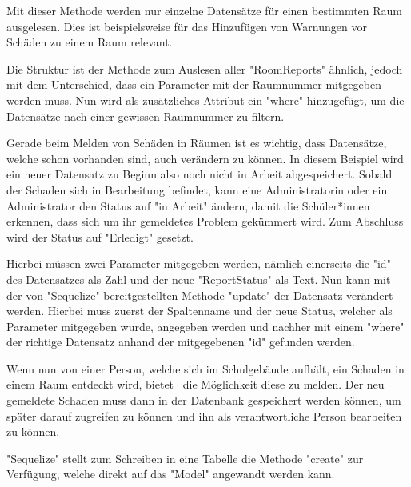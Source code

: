 

Mit dieser Methode werden nur einzelne Datensätze für einen bestimmten Raum ausgelesen. Dies ist beispielsweise für das Hinzufügen von Warnungen vor Schäden zu einem Raum relevant. 

Die Struktur ist der Methode zum Auslesen aller "RoomReports" ähnlich, jedoch mit dem Unterschied, dass ein Parameter mit der Raumnummer mitgegeben werden muss. Nun wird als zusätzliches Attribut ein "where" hinzugefügt, um die Datensätze nach einer gewissen Raumnummer zu filtern.



Gerade beim Melden von Schäden in Räumen ist es wichtig, dass Datensätze, welche schon vorhanden sind, auch verändern zu können. In diesem Beispiel wird ein neuer Datensatz zu Beginn also noch nicht in Arbeit abgespeichert. Sobald der Schaden sich in Bearbeitung befindet, kann eine Administratorin oder ein Administrator den Status auf "in Arbeit" ändern, damit die Schüler*innen erkennen, dass sich um ihr gemeldetes Problem gekümmert wird. Zum Abschluss wird der Status auf "Erledigt" gesetzt.

Hierbei müssen zwei Parameter mitgegeben werden, nämlich einerseits die "id" des Datensatzes als Zahl und der neue "ReportStatus" als Text. Nun kann mit der von "Sequelize" bereitgestellten Methode "update" der Datensatz verändert werden. Hierbei muss zuerst der Spaltenname und der neue Status, welcher als Parameter mitgegeben wurde, angegeben werden und nachher mit einem "where" der richtige Datensatz anhand der mitgegebenen "id" gefunden werden.



Wenn nun von einer Person, welche sich im Schulgebäude aufhält, ein Schaden in einem Raum entdeckt wird, bietet \ZELIA\ die Möglichkeit diese zu melden. Der neu gemeldete Schaden muss dann in der Datenbank gespeichert werden können, um später darauf zugreifen zu können und ihn als verantwortliche Person bearbeiten zu können.

"Sequelize" stellt zum Schreiben in eine Tabelle die Methode "create" zur Verfügung, welche direkt auf das "Model" angewandt werden kann.

